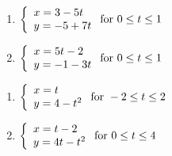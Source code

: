 \begin{multicols}{2}

\begin{enumerate}

\setcounter{enumi}{\value{HW}}

\item  ${\displaystyle \left\{ \begin{array}{l} x = 3-5t \\ y =-5+7t \end{array} \right. \vspace{.25in} \mbox{for } 0 \leq t \leq 1}$

\item  ${\displaystyle \left\{ \begin{array}{l} x = 5t-2 \\ y =-1-3t \end{array} \right. \vspace{.25in} \mbox{for } 0 \leq t \leq 1}$

\setcounter{HW}{\value{enumi}}

\end{enumerate}

\end{multicols}

\begin{multicols}{2}

\begin{enumerate}

\setcounter{enumi}{\value{HW}}

\item  ${\displaystyle \left\{ \begin{array}{l} x = t \\ y = 4-t^2  \end{array} \right. \vspace{.25in} \mbox{for } -2 \leq t \leq 2}$

\item  ${\displaystyle \left\{ \begin{array}{l} x = t-2 \\ y = 4t-t^2  \end{array} \right. \vspace{.25in} \mbox{for } 0 \leq t \leq 4}$


\setcounter{HW}{\value{enumi}}

\end{enumerate}

\end{multicols}

